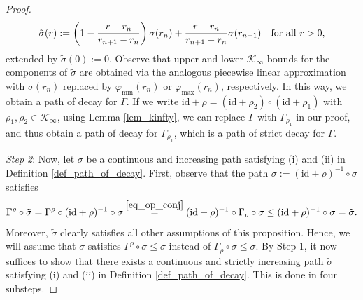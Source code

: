 \documentclass[10pt, oneside, a4paper]{article}
\newcommand{\id}{\mathrm{id}}
\newcommand{\KC}{\mathcal{K}}
\begin{document}
\begin{proof}
\begin{equation*}
  \tilde{\sigma}(r) := \left(1 - \frac{r - r_n}{r_{n+1} - r_n}\right)\sigma(r_n) + \frac{r - r_n}{r_{n+1} - r_n}\sigma(r_{n+1}) \mbox{\quad for all\ } r > 0,%
\end{equation*}
extended by $\tilde{\sigma}(0) := 0$. Observe that upper and lower $\KC_{\infty}$-bounds for the components of $\tilde{\sigma}$ are obtained via the analogous piecewise linear approximation with $\sigma(r_n)$ replaced by $\varphi_{\min}(r_n)$ or $\varphi_{\max}(r_n)$, respectively. In this way, we obtain a path of decay for $\Gamma$. If we write $\id + \rho = (\id + \rho_2) \circ (\id + \rho_1)$ with $\rho_1,\rho_2 \in \KC_{\infty}$, using Lemma \ref{lem_kinfty}, we can replace $\Gamma$ with $\Gamma_{\rho_1}$ in our proof, and thus obtain a path of decay for $\Gamma_{\rho_1}$, which is a path of strict decay for $\Gamma$.%

\emph{Step 2}: Now, let $\sigma$ be a continuous and increasing path satisfying (i) and (ii) in Definition \ref{def_path_of_decay}. First, observe that the path $\tilde{\sigma} := (\id + \rho)^{-1} \circ \sigma$ satisfies%
\begin{equation*}
  \Gamma^{\rho} \circ \tilde{\sigma} = \Gamma^{\rho} \circ (\id + \rho)^{-1} \circ \sigma \stackrel{\eqref{eq_op_conj}}{=} (\id + \rho)^{-1} \circ \Gamma_{\rho} \circ \sigma \leq (\id + \rho)^{-1} \circ \sigma = \tilde{\sigma}.%
\end{equation*}
Moreover, $\tilde{\sigma}$ clearly satisfies all other assumptions of this proposition. Hence, we will assume that $\sigma$ satisfies $\Gamma^{\rho} \circ \sigma \leq \sigma$ instead of $\Gamma_{\rho} \circ \sigma \leq \sigma$. By Step 1, it now suffices to show that there exists a continuous and strictly increasing path $\tilde{\sigma}$ satisfying (i) and (ii) in Definition \ref{def_path_of_decay}. This is done in four substeps.%


\end{proof}
\end{document}
